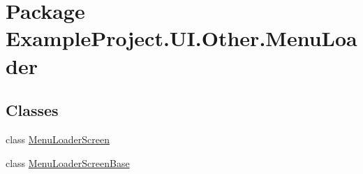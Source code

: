 \hypertarget{namespace_example_project_1_1_u_i_1_1_other_1_1_menu_loader}{}\section{Package Example\+Project.\+U\+I.\+Other.\+Menu\+Loader}
\label{namespace_example_project_1_1_u_i_1_1_other_1_1_menu_loader}
\subsection*{Classes}
\begin{DoxyCompactItemize}
\item 
class \hyperlink{class_example_project_1_1_u_i_1_1_other_1_1_menu_loader_1_1_menu_loader_screen}{Menu\+Loader\+Screen}
\item 
class \hyperlink{class_example_project_1_1_u_i_1_1_other_1_1_menu_loader_1_1_menu_loader_screen_base}{Menu\+Loader\+Screen\+Base}
\end{DoxyCompactItemize}
